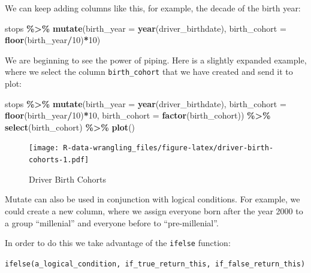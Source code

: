 \documentclass[
]{book}
\newenvironment{Shaded}{\begin{snugshade}}{\end{snugshade}}
\newcommand{\AttributeTok}[1]{\textcolor[rgb]{0.13,0.29,0.53}{#1}}
\newcommand{\DecValTok}[1]{\textcolor[rgb]{0.00,0.00,0.81}{#1}}
\newcommand{\FunctionTok}[1]{\textcolor[rgb]{0.13,0.29,0.53}{\textbf{#1}}}
\newcommand{\NormalTok}[1]{#1}
\newcommand{\SpecialCharTok}[1]{\textcolor[rgb]{0.81,0.36,0.00}{\textbf{#1}}}
\begin{document}
We can keep adding columns like this, for example, the decade of the birth year:

\begin{Shaded}
\begin{Highlighting}[]
\NormalTok{stops }\SpecialCharTok{\%\textgreater{}\%} 
  \FunctionTok{mutate}\NormalTok{(}\AttributeTok{birth\_year =} \FunctionTok{year}\NormalTok{(driver\_birthdate),}
         \AttributeTok{birth\_cohort =} \FunctionTok{floor}\NormalTok{(birth\_year}\SpecialCharTok{/}\DecValTok{10}\NormalTok{)}\SpecialCharTok{*}\DecValTok{10}\NormalTok{) }
\end{Highlighting}
\end{Shaded}

We are beginning to see the power of piping. Here is a slightly expanded example, where we select the column \texttt{birth\_cohort} that we have created and send it to plot:

\begin{Shaded}
\begin{Highlighting}[]
\NormalTok{stops }\SpecialCharTok{\%\textgreater{}\%} 
  \FunctionTok{mutate}\NormalTok{(}\AttributeTok{birth\_year =} \FunctionTok{year}\NormalTok{(driver\_birthdate),}
         \AttributeTok{birth\_cohort =} \FunctionTok{floor}\NormalTok{(birth\_year}\SpecialCharTok{/}\DecValTok{10}\NormalTok{)}\SpecialCharTok{*}\DecValTok{10}\NormalTok{,}
         \AttributeTok{birth\_cohort =} \FunctionTok{factor}\NormalTok{(birth\_cohort)) }\SpecialCharTok{\%\textgreater{}\%}
    \FunctionTok{select}\NormalTok{(birth\_cohort) }\SpecialCharTok{\%\textgreater{}\%} 
    \FunctionTok{plot}\NormalTok{()}
\end{Highlighting}
\end{Shaded}

\begin{figure}
\centering
\texttt{[image: R-data-wrangling\_files/figure-latex/driver-birth-cohorts-1.pdf]}
\caption{\label{fig:driver-birth-cohorts}Driver Birth Cohorts}
\end{figure}

Mutate can also be used in conjunction with logical conditions. For example, we could create a new column, where we assign everyone born after the year 2000 to a group ``millenial'' and everyone before to ``pre-millenial''.

In order to do this we take advantage of the \texttt{ifelse} function:

\texttt{ifelse(a\_logical\_condition,\ if\_true\_return\_this,\ if\_false\_return\_this)}
\end{document}
